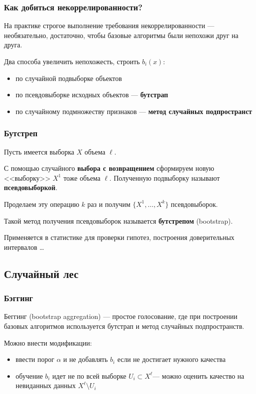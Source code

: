 \documentclass{beamer}
\begin{document}
	\begin{frame}
		\frametitle{Как добиться некоррелированности?}

		На практике строгое выполнение требования некоррелированности --- необязательно,
		достаточно, чтобы базовые алгоритмы были непохожи друг на друга.

		\vspace{15pt}

		Два способа увеличить непохожесть, строить $b_i(x)$:
		\begin{itemize}
			\item по случайной подвыборке объектов
			\item по псевдовыборке исходных объектов --- \textbf{бутстрап}
			\item по случайному подмножеству признаков --- \textbf{метод случайных подпространст}
		\end{itemize}
	\end{frame}

	\begin{frame}
		\frametitle{Бутстреп}

		Пусть имеется выборка $X$ объема $\ell$.

		\vspace{15pt}

		С помощью случайного \textbf{выбора с возвращением} сформируем новую <<выборку>> $X^1$ тоже объема $\ell$. 
		Полученную подвыборку называют \textbf{псевдовыборкой}.

		Проделаем эту операцию $k$ раз и получим $\{X^1, \dots, X^k\}$ псевдовыборок.

		\vspace{15pt}

		Такой метод получения псевдовыборок называется \textbf{бутстрепом} (bootstrap).

		\vspace{15pt}

		Применяется в статистике для проверки гипотез, построения доверительных интервалов \dots
	\end{frame}

	\subsection{Случайный лес}

	\begin{frame}
		\frametitle{Бэггинг}
		Беггинг (bootstrap aggregation) --- простое голосование, где при построении базовых алгоритмов используется
		бутстрап и метод случайных подпространств.

		\vspace{15pt}

		Можно внести модификации:
		\begin{itemize}
			\item ввести порог $\alpha$ и не добавлять $b_i$ если не достигает нужного качества
			\item обучение $b_i$ идет не по всей выборке $U_i \subset X^{\ell}$--- можно оценить качество на невиданных данных $X^{\ell} \setminus U_i$
		\end{itemize}
	\end{frame}
\end{document}
